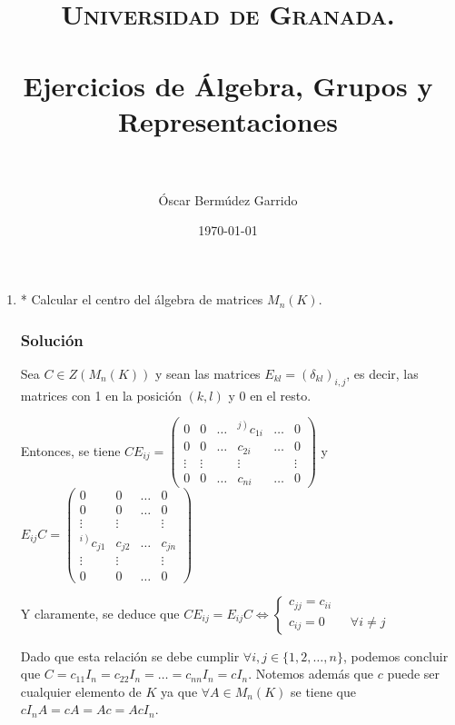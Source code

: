 \documentclass[paper=a4, fontsize=11pt, spanish]{scrartcl}
\title{
  \normalfont \normalsize 
  \textsc{Universidad de Granada.} \\ [25pt] %
  \horrule{0.5pt} \\[0.4cm] %
  \huge Ejercicios de Álgebra, Grupos y Representaciones \\ %
  \horrule{2pt} \\[0.5cm] %
}
\author{Óscar Bermúdez Garrido} %
\date{\normalsize\today} %
\begin{document}
	\maketitle %
	
	\newpage

	\begin{enumerate}
		\item * Calcular el centro del álgebra de matrices $M_n(K)$.
		\subsubsection*{Solución}
		Sea $C \in Z(M_n(K))$ y sean las matrices $E_{kl} = (\delta_{kl})_{i,j}$, es decir, las matrices con
		1 en la posición $(k, l)$ y 0 en el resto.
		
		Entonces, se tiene $CE_{ij} =
		\begin{pmatrix}
			   0   &    0   & \dots  & {}^{\left.j\right)}c_{1i} & \dots  &    0   \\
			   0   &    0   & \dots  &           c_{2i}          & \dots  &    0   \\
			\vdots & \vdots &        &           \vdots          &        & \vdots \\
			   0   &    0   & \dots  &           c_{ni}          & \dots  &    0
		\end{pmatrix}$
		y $E_{ij}C =
		\begin{pmatrix}
			             0            &    0   & \dots  &    0   \\
			             0            &    0   & \dots  &    0   \\
			          \vdots          & \vdots &        & \vdots \\
			{}^{\left.i\right)}c_{j1} & c_{j2} & \dots  & c_{jn} \\
			          \vdots          & \vdots &        & \vdots \\
			             0            &    0   & \dots  &    0
		\end{pmatrix}$
		
		Y claramente, se deduce que $CE_{ij} = E_{ij}C \Leftrightarrow
		\begin{cases}
			c_{jj} = c_{ii} \\
			c_{ij} = 0 \qquad \forall i \neq j
		\end{cases}$
		
		Dado que esta relación se debe cumplir $\forall i,j \in \{1, 2, \dots, n\}$, podemos concluir que $C =
		c_{11}I_n = c_{22}I_n = \dots = c_{nn}I_n = cI_n$. Notemos además que $c$ puede ser cualquier elemento
		de $K$ ya que $\forall A \in M_n(K)$ se tiene que $cI_nA = cA = Ac = AcI_n$.
		

\end{enumerate}
\end{document}
